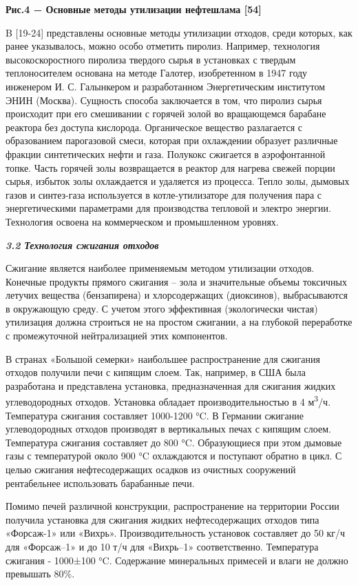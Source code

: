 {\bfseries Рис.4 − Основные методы утилизации нефтешлама {[}54{]}}

B {[}19-24{]} представлены основные методы утилизации отходов, среди
которых, как ранее указывалось, можно особо отметить пиролиз. Например,
технология высокоскоростного пиролиза твердого сырья в установках с
твердым теплоносителем основана на методе Галотер, изобретенном в 1947
году инженером И. С. Галынкером и разработанном Энергетическим
институтом ЭНИН (Москва). Сущность способа заключается в том, что
пиролиз сырья происходит при его смешивании с горячей золой во
вращающемся барабане реактора без доступа кислорода. Органическое
вещество разлагается с образованием парогазовой смеси, которая при
охлаждении образует различные фракции синтетических нефти и газа.
Полукокс сжигается в аэрофонтанной топке. Часть горячей золы
возвращается в реактор для нагрева свежей порции сырья, избыток золы
охлаждается и удаляется из процесса. Тепло золы, дымовых газов и
синтез-газа используется в котле-утилизаторе для получения пара с
энергетическими параметрами для производства тепловой и электро энергии.
Технология освоена на коммерческом и промышленном уровнях.

\emph{{\bfseries 3.2 Технология сжигания отходов}}

Сжигание является наиболее применяемым методом утилизации отходов.
Конечные продукты прямого сжигания -- зола и значительные объемы
токсичных летучих вещества (бензапирена) и хлорсодержащих (диоксинов),
выбрасываются в окружающую среду. С учетом этого эффективная
(экологически чистая) утилизация должна строиться не на простом
сжигании, а на глубокой переработке с промежуточной нейтрализацией этих
компонентов.

В странах «Большой семерки» наибольшее распро­странение для сжигания
отходов получили печи с кипя­щим слоем. Так, например, в США была
разработана и представлена установка, предназначенная для сжигания
жидких углеводородных отходов. Установка обладает производительностью в
4 м\textsuperscript{3}/ч. Температура сжигания составля­ет 1000-1200 °C.
В Германии сжигание углеводородных отходов производят в вертикальных
печах с кипящим слоем. Температура сжигания составляет до 800 °C.
Образующиеся при этом дымовые газы с температурой около 900 °C
охлаждаются и поступают обратно в цикл. С целью сжигания нефтесодержащих
осадков из очистных сооружений рентабельнее использовать бара­банные
печи.

Помимо печей различной конструкции, распростра­нение на территории России
получила установка для сжигания жидких нефтесодержащих отхо­дов типа
«Форсаж-1» или «Вихрь». Производительность установок составляет до 50
кг/ч для «Форсаж--1» и до 10 т/ч для «Вихрь--1» соответственно.
Температура сжигания - 1000±100 °C. Содержание минеральных примесей и
влаги не должно превышать 80\%.

